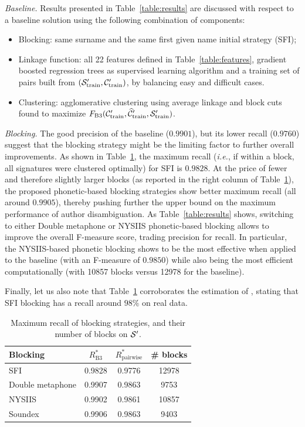 \documentclass{article}
\newcommand{\ie}{\emph{i.e.}\xspace}
\begin{document}
\textit{Baseline.} Results presented in Table~\ref{table:results} are discussed with
respect to a baseline solution using the following combination of components:
\begin{itemize}
\item Blocking: same surname and the same first given name initial strategy (SFI);
\item Linkage function: all 22 features defined in Table~\ref{table:features},
    gradient boosted regression trees as supervised learning algorithm
    and a training set of pairs built from $({\cal S}_\text{train}^\prime, {\cal C}_\text{train}^\prime)$, by balancing easy and difficult cases.
\item Clustering: agglomerative clustering using average linkage and
    block cuts found to maximize $F_\text{B3}({\cal C}_\text{train}^\prime, \widehat{\cal C}_\text{train}^\prime, {\cal S}_\text{train}^\prime)$.
\end{itemize}


\textit{Blocking.} The good precision of the baseline ($0.9901$), but its
lower recall ($0.9760$) suggest that the blocking strategy might be the
limiting factor to further overall improvements.
As shown in Table~\ref{table:blocking}, the maximum recall (\ie, if within a block, all signatures were clustered optimally) for SFI is $0.9828$.
At the price of fewer and therefore slightly larger blocks (as reported in the right column of Table~\ref{table:blocking}), the
proposed phonetic-based blocking strategies show better maximum recall (all
around $0.9905$), thereby pushing further the upper bound on the maximum
performance of author disambiguation.
As Table~\ref{table:results} shows, switching to either Double metaphone or NYSIIS phonetic-based blocking allows
to improve the overall F-measure score, trading precision for recall.
In particular, the NYSIIS-based phonetic blocking shows to be the most effective when applied
to the baseline (with an F-measure of $0.9850$) while also being the most
efficient computationally (with 10857 blocks versus 12978 for the baseline).

Finally, let us also note that Table~\ref{table:blocking} corroborates the
estimation of \citep{torvik2009author}, stating that SFI blocking has a recall
around $98\%$ on real data.

\begin{table}
\caption{Maximum recall of blocking strategies, and their number of blocks on ${\cal S}^\prime$.}
\label{table:blocking}
\centering
\begin{tabular}{|l|cc|c|}
  \hline
  \textbf{Blocking} & $R_\text{B3}^*$ & $R_\text{pairwise}^*$ & \# blocks \\
  \hline
  \hline
    SFI & 0.9828 & 0.9776 & 12978 \\
    Double metaphone & 0.9907 & 0.9863 & 9753 \\
    NYSIIS & 0.9902 & 0.9861 & 10857 \\
    Soundex & 0.9906 & 0.9863 & 9403 \\
  \hline
\end{tabular}
\end{table}
\end{document}
